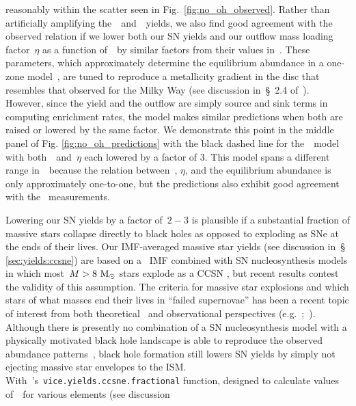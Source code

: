\documentclass[ms.tex]{subfiles}
\begin{document}
reasonably within the scatter seen in Fig.~\ref{fig:no_oh_observed}.
Rather than artificially amplifying the~\cristallo~and~\ventura~yields, we also
find good agreement with the observed relation if we lower both our SN yields
and our outflow mass loading factor~$\eta$ as a function of~\rgal~by similar
factors from their values in~\citet{Johnson2021}.
These parameters, which approximately determine the equilibrium abundance in a
one-zone model~\citep{Weinberg2017}, are tuned to reproduce a metallicity
gradient in the disc that resembles that observed for the Milky Way (see
discussion in~\S~2.4 of~\citealp{Johnson2021}).
However, since the yield and the outflow are simply source and sink terms in
computing enrichment rates, the model makes similar predictions when both are
raised or lowered by the same factor.
We demonstrate this point in the middle panel of Fig.
\ref{fig:no_oh_predictions} with the black dashed line for the~\cristallo~model
with both~~and~$\eta$ each lowered by a factor of 3.
This model spans a different range in~\oh~because the relation between~,
$\eta$, and the equilibrium abundance is only approximately one-to-one, but the
predictions also exhibit good agreement with the~\citet{Dopita2016}
measurements.
\par
Lowering our SN yields by a factor of~$2 - 3$ is plausible if a substantial
fraction of massive stars collapse directly to black holes as opposed to
exploding as SNe at the ends of their lives.
Our IMF-averaged massive star yields (see discussion in~\S
\ref{sec:yields:ccsne}) are based on a~\citet{Kroupa2001} IMF combined with SN
nucleosynthesis models in which most~$M > 8~\text{M}_\odot$ stars explode as a CCSN
\cite[e.g.][]{Woosley1995, Chieffi2004, Chieffi2013, Limongi2018, Nomoto2013},
but recent results contest the validity of this assumption.
The criteria for massive star explosions and which stars of what masses end
their lives in ``failed supernovae'' has been a recent topic of interest from
both theoretical~\citep[e.g.][]{Pejcha2015, Sukhbold2016, Ertl2016} and
observational perspectives (e.g.~\citealp*{Gerke2015};~\citealp{Adams2017,
Basinger2021}).
Although there is presently no combination of a SN nucleosynthesis model with
a physically motivated black hole landscape is able to reproduce the observed
abundance patterns~\citep{Griffith2021a}, black hole formation still lowers
SN yields by simply not ejecting massive star envelopes to the ISM.
With~\vice's~\texttt{vice.yields.ccsne.fractional} function, designed to
calculate values of~~for various elements (see discussion
\end{document}
